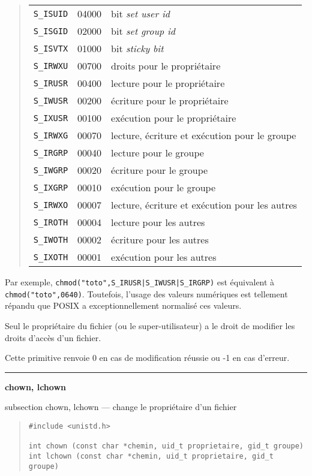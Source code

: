 \documentclass [twoside] {report}
\newcommand {\primitive} [1]
    {
	\phantomsection
	{\large \textbf {#1}}
	\addcontentsline {toc} {subsection} {#1}
    }
\newcommand {\separation}
    {
	\vspace {5mm}
	\nopagebreak
	\hrule
    }
\begin{document}
\begin {quote}
    \begin {tabular} {|lll|} \hline
	\texttt {S\_ISUID} & 04000 & bit \textit {set user id} \\
	\texttt {S\_ISGID} & 02000 & bit \textit {set group id} \\
	\texttt {S\_ISVTX} & 01000 & bit \textit {sticky bit} \\
	\texttt {S\_IRWXU} & 00700 & droits pour le propriétaire \\
	\texttt {S\_IRUSR} & 00400 & lecture pour le propriétaire \\
	\texttt {S\_IWUSR} & 00200 & écriture pour le propriétaire \\
	\texttt {S\_IXUSR} & 00100 & exécution pour le propriétaire \\
	\texttt {S\_IRWXG} & 00070 & lecture, écriture et exécution pour le groupe \\
	\texttt {S\_IRGRP} & 00040 & lecture pour le groupe \\
	\texttt {S\_IWGRP} & 00020 & écriture pour le groupe \\
	\texttt {S\_IXGRP} & 00010 & exécution pour le groupe \\
	\texttt {S\_IRWXO} & 00007 & lecture, écriture et exécution pour les autres \\
	\texttt {S\_IROTH} & 00004 & lecture pour les autres \\
	\texttt {S\_IWOTH} & 00002 & écriture pour les autres \\
	\texttt {S\_IXOTH} & 00001 & exécution pour les autres \\ \hline
    \end {tabular}
\end {quote}

Par exemple, \verb/chmod("toto",S_IRUSR|S_IWUSR|S_IRGRP)/ est
équivalent à \verb/chmod("toto",0640)/.
Toutefois, l'usage des valeurs numériques est tellement répandu que
POSIX a exceptionnellement normalisé ces valeurs.

Seul le propriétaire du fichier (ou le
super-utilisateur) a le droit de modifier les
droits d'accès d'un fichier.

Cette primitive renvoie 0 en cas de modification
réussie ou -1 en cas d'erreur.




\separation
\primitive {chown, lchown} --- change le propriétaire d'un fichier

\begin {quote}
\begin {verbatim}
#include <unistd.h>

int chown (const char *chemin, uid_t proprietaire, gid_t groupe)
int lchown (const char *chemin, uid_t proprietaire, gid_t groupe)
\end{verbatim}
\end {quote}
\end{document}
